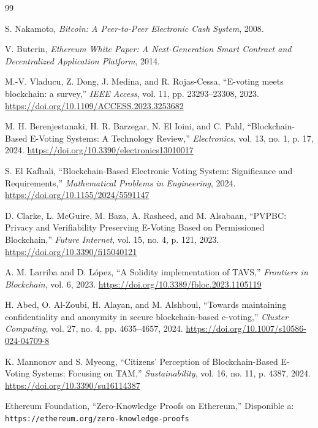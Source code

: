 \documentclass[12pt,a4paper,catalan]{article}
\begin{document}
\begin{thebibliography}{99}

S. Nakamoto,
\textit{Bitcoin: A Peer-to-Peer Electronic Cash System}, 2008.

V. Buterin,
\textit{Ethereum White Paper: A Next-Generation Smart Contract and Decentralized Application Platform}, 2014.

M.-V. Vladucu, Z. Dong, J. Medina, and R. Rojas-Cessa,
``E-voting meets blockchain: a survey,''
\textit{IEEE Access}, vol. 11, pp. 23293--23308, 2023.
\url{https://doi.org/10.1109/ACCESS.2023.3253682}

M. H. Berenjestanaki, H. R. Barzegar, N. El Ioini, and C. Pahl,
``Blockchain-Based E-Voting Systems: A Technology Review,''
\textit{Electronics}, vol. 13, no. 1, p. 17, 2024.
\url{https://doi.org/10.3390/electronics13010017}

S. El Kafhali,
``Blockchain-Based Electronic Voting System: Significance and Requirements,''
\textit{Mathematical Problems in Engineering}, 2024.
\url{https://doi.org/10.1155/2024/5591147}

D. Clarke, L. McGuire, M. Baza, A. Rasheed, and M. Alsabaan,
``PVPBC: Privacy and Verifiability Preserving E-Voting Based on Permissioned Blockchain,''
\textit{Future Internet}, vol. 15, no. 4, p. 121, 2023.
\url{https://doi.org/10.3390/fi15040121}

A. M. Larriba and D. López,
``A Solidity implementation of TAVS,''
\textit{Frontiers in Blockchain}, vol. 6, 2023.
\url{https://doi.org/10.3389/fbloc.2023.1105119}

H. Abed, O. Al-Zoubi, H. Alayan, and M. Alshboul,
``Towards maintaining confidentiality and anonymity in secure blockchain-based e-voting,''
\textit{Cluster Computing}, vol. 27, no. 4, pp. 4635--4657, 2024.
\url{https://doi.org/10.1007/s10586-024-04709-8}

K. Mannonov and S. Myeong,
``Citizens' Perception of Blockchain-Based E-Voting Systems: Focusing on TAM,''
\textit{Sustainability}, vol. 16, no. 11, p. 4387, 2024.
\url{https://doi.org/10.3390/su16114387}

Ethereum Foundation,
``Zero-Knowledge Proofs on Ethereum,''
Disponible a: \texttt{https://ethereum.org/zero-knowledge-proofs}


\end{thebibliography}
\end{document}

